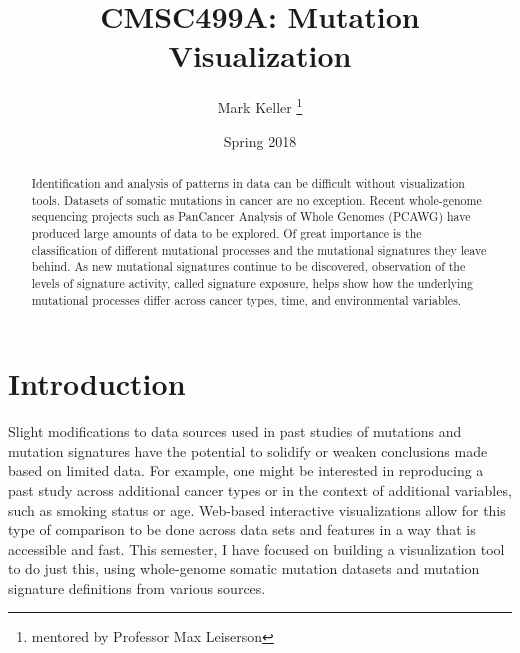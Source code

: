 \documentclass[12pt, letterpaper]{article}
\title{CMSC499A: Mutation Visualization}
\author{Mark Keller \thanks{mentored by Professor Max Leiserson}}
\date{Spring 2018}
\begin{document}
\maketitle

\begin{abstract}
Identification and analysis of patterns in data can be difficult without visualization tools. 
Datasets of somatic mutations in cancer are no exception.
Recent whole-genome sequencing projects such as PanCancer Analysis of Whole Genomes (PCAWG) have produced large amounts of data to be explored.
Of great importance is the classification of different mutational processes and the mutational signatures\cite{alexandrov2013signatures} they leave behind.
As new mutational signatures continue to be discovered, observation of the levels of signature activity, called signature exposure, helps show how the underlying mutational processes differ across cancer types, time, and environmental variables.
\end{abstract}

\section{Introduction}
Slight modifications to data sources used in past studies of mutations and mutation signatures have the potential to solidify or weaken conclusions made based on limited data.
For example, one might be interested in reproducing a past study across additional cancer types or in the context of additional variables, such as smoking status or age.
Web-based interactive visualizations allow for this type of comparison to be done across data sets and features in a way that is accessible and fast.
This semester, I have focused on building a visualization tool to do just this, using whole-genome somatic mutation datasets and mutation signature definitions from various sources.
\end{document}

